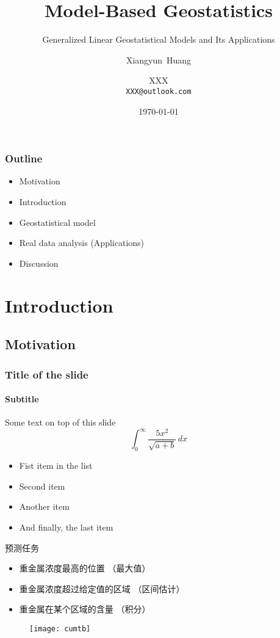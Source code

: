 \documentclass[11pt,UTF8]{ctexbeamer}
\title{Model-Based Geostatistics}
\subtitle{Generalized Linear Geostatistical Models and Its Applications}
\author{Xiangyun~Huang \and XXX \\
\texttt{XXX@outlook.com} }
\institute[China University of Mining and Technology,Beijing]
{
Department of Statistics\\ %
China University of Mining and Technology,Beijing
}
\date{\today}
\begin{document}
\begin{frame}
\titlepage
\end{frame}

\begin{frame}
\frametitle{Outline}
\begin{itemize}
  \item Motivation
  \item Introduction 
  \item Geostatistical model
  \item Real data analysis (Applications)
  \item Discussion
\end{itemize}
\end{frame}

\section{Introduction}
\subsection{Motivation}
  \begin{frame}
    \frametitle{Title of the slide}
    \framesubtitle{Subtitle}
    Some text on top of this slide
    \[
    \int_{0}^{\infty} \frac{5x^2}{\sqrt{a+b}}\, dx
    \]
    \begin{itemize}
    \item[\checkmark] Fist item in the list
    \item Second item
    \item Another item
    \item And finally, the last item
  \end{itemize}
  \end{frame}
 
\begin{frame}{预测任务}
\begin{itemize}
\item 重金属浓度最高的位置 （最大值）
\item 重金属浓度超过给定值的区域  （区间估计）
\item 重金属在某个区域的含量 （积分）
\end{itemize}
\end{frame}

\begin{frame}
\begin{figure}
\centering
\texttt{[image: cumtb]}
\end{figure}
\end{frame} 
 
 
\end{document}
